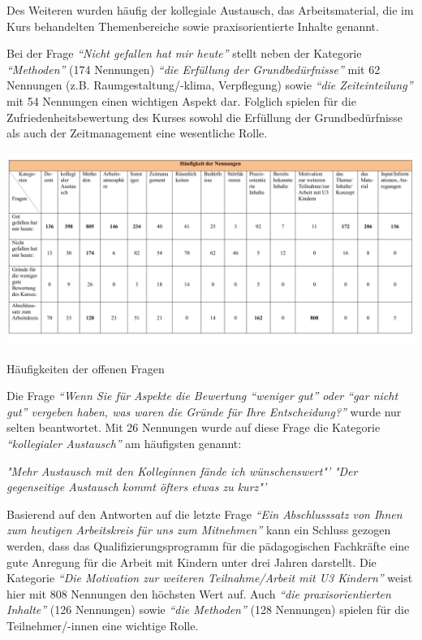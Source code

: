 \documentclass[12pt,a4paper]{article}
\begin{document}
Des Weiteren wurden häufig der kollegiale Austausch, das Arbeitsmaterial, die im Kurs behandelten Themenbereiche sowie praxisorientierte Inhalte genannt.

Bei der Frage \textit{"`Nicht gefallen hat mir heute"'} stellt neben der Kategorie \textit{"`Methoden"' }(174 Nennungen)\textit{ "`die Erfüllung der Grundbedürfnisse"'} mit 62 Nennungen (z.B. Raumgestaltung/-klima, Verpflegung) sowie \textit{"`die Zeiteinteilung"'} mit 54 Nennungen einen wichtigen Aspekt dar. Folglich spielen für die Zufriedenheitsbewertung des Kurses sowohl die Erfüllung der Grundbedürfnisse als auch der Zeitmanagement eine wesentliche Rolle. 

\begin{table}[!ht]
\includegraphics[scale=0.71,angle=90]{tab04.pdf}
\caption{Häufigkeiten der offenen Fragen}
\label{tab.9}
\end{table}

Die Frage \textit{"`Wenn Sie für Aspekte die Bewertung "`weniger gut"' oder "`gar nicht gut"' vergeben haben, was waren die Gründe für Ihre Entscheidung?"'} wurde nur selten beantwortet. Mit 26 Nennungen wurde auf diese Frage die Kategorie \textit{"`kollegialer Austausch"'} am häufigsten genannt:

\textit{ "Mehr Austausch mit den Kolleginnen fände ich wünschenswert"'}
\textit{ "Der gegenseitige Austausch kommt öfters etwas zu kurz"'}

Basierend auf den Antworten auf die letzte Frage \textit{"`Ein Abschlusssatz von Ihnen zum heutigen Arbeitskreis für uns zum Mitnehmen"'} kann ein Schluss gezogen werden, dass das Qualifizierungsprogramm für die pädagogischen Fachkräfte eine gute Anregung für die Arbeit mit Kindern unter drei Jahren darstellt. Die Kategorie \textit{"`Die Motivation zur weiteren Teilnahme/Arbeit mit U3 Kindern"'} weist hier mit 808 Nennungen den höchsten Wert auf. Auch \textit{"`die praxisorientierten Inhalte"'} (126 Nennungen) sowie \textit{"`die Methoden"'} (128 Nennungen) spielen für die Teilnehmer/-innen eine wichtige Rolle. 
\end{document}
